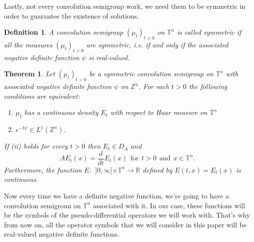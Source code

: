 \documentclass[11pt]{article}
\newtheorem{theorem}{Theorem}
\newtheorem{definition}{Definition}
\begin{document}
Lastly, not every convolution semigroup work, we need them to be symmetric in order to guarantee the existence of solutions.

\begin{definition}
	A convolution semigroup $(\mu_t)_{t>0}$ on $\mathbb{T}^n$ is called symmetric if all the measures $(\mu_t)_{t>0}$ are symmetric, i.e. if and only if the associated negative definite function $\psi$ si real-valued.
\end{definition}

\begin{theorem}\label{teoremaconvergenciasoluciones}
	Let $(\mu_t)_{t>0}$ be a symmetric convolution semigroup on $\mathbb{T}^n$ with associated negative definite function $\psi$ on $\mathbb{Z}^n$. For each $t>0$ the following conditions are equivalent:
	\begin{enumerate}[label=(\roman*)]
		\item $\mu_t$ has a continuous density $E_t$ with respect to Haar measure on $\mathbb{T}^n$
		\item $e^{-t\psi}\in L^1 (\mathbb{Z}^n)$.
	\end{enumerate}
	If (ii) holds for every $t>0$ then $E_t \in D_A$ and $$AE_t(x)=\frac{d}{dt}E_t (x) \hspace{5pt}\text{for}\hspace{5pt}t>0 \hspace{5pt}\text{and}\hspace{5pt}x\in \mathbb{T}^n.$$ Furthermore, the function $E:\hspace{5pt}]0, \infty[ \times \mathbb{T}^n \to \mathbb{R}$ defined by $E(t,x)=E_t (x)$ is continuous.
\end{theorem}

Now every time we have a definite negative function,  we're going to have a convolution semigroun on $\mathbb{T}^n$ associated with it. In our case, these functions will be the symbols of the pseudo-differential operators we will work with. That's why from now on, all the operator symbols that we will consider in this paper will be real-valued negative definite functions.
\end{document}
